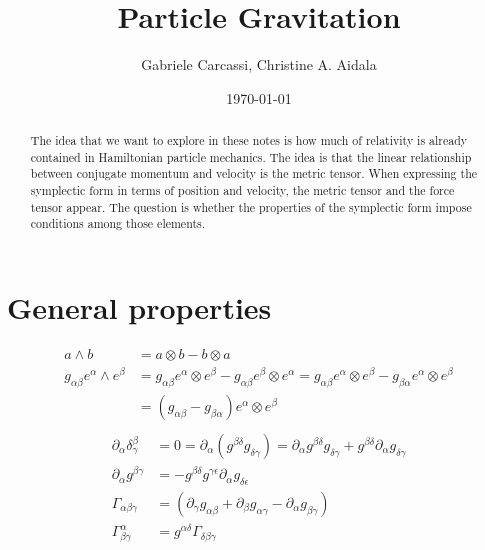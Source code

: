 \documentclass[11pt]{article}
\begin{document}
\title{Particle Gravitation}
\author{Gabriele Carcassi, Christine A. Aidala}

\date{\today}

\maketitle

\begin{abstract}
	The idea that we want to explore in these notes is how much of relativity is already contained in Hamiltonian particle mechanics. The idea is that the linear relationship between conjugate momentum and velocity is the metric tensor. When expressing the symplectic form in terms of position and velocity, the metric tensor and the force tensor appear. The question is whether the properties of the symplectic form impose conditions among those elements.
\end{abstract}

\section{General properties}
\begin{equation}
\begin{aligned}
a \wedge b &= a \otimes b - b \otimes a \\
g_{\alpha\beta} e^\alpha \wedge e^\beta &= g_{\alpha\beta} e^\alpha \otimes e^\beta - g_{\alpha\beta} e^\beta \otimes e^\alpha = g_{\alpha\beta} e^\alpha \otimes e^\beta - g_{\beta\alpha} e^\alpha \otimes e^\beta \\
&= (g_{\alpha\beta} - g_{\beta\alpha}) e^\alpha \otimes e^\beta \\
\end{aligned}
\end{equation}
\begin{equation}
\begin{aligned}
\partial_\alpha \delta^\beta_\gamma &= 0 = \partial_\alpha ( g^{\beta \delta} g_{\delta \gamma} ) = \partial_\alpha g^{\beta \delta} g_{\delta \gamma} + g^{\beta \delta} \partial_\alpha g_{\delta \gamma} \\
\partial_\alpha g^{\beta \gamma} &= - g^{\beta \delta} g^{\gamma \epsilon} \partial_\alpha g_{\delta \epsilon} \\
\Gamma_{\alpha \beta \gamma} &= (\partial_\gamma g_{\alpha\beta} + \partial_\beta g_{\alpha\gamma} - \partial_\alpha g_{\beta\gamma}) \\
\Gamma^\alpha_{\beta\gamma} &= g^{\alpha \delta} \Gamma_{\delta\beta\gamma}
\end{aligned}
\end{equation}
\end{document}
